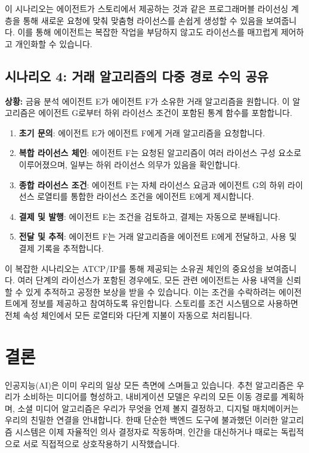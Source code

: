 \documentclass[journal,onecolumn]{IEEEtran} %
\begin{document}
이 시나리오는 에이전트가 스토리에서 제공하는 것과 같은 프로그래머블 라이선싱 계층\cite{ref6}을 통해 새로운 요청에 맞춰 맞춤형 라이선스를 손쉽게 생성할 수 있음을 보여줍니다. 이를 통해 에이전트는 복잡한 작업을 부담하지 않고도 라이선스를 매끄럽게 제어하고 개인화할 수 있습니다.

\subsection{시나리오 4: 거래 알고리즘의 다중 경로 수익 공유}
\textbf{상황:} 금융 분석 에이전트 E가 에이전트 F가 소유한 거래 알고리즘을 원합니다. 이 알고리즘은 에이전트 G로부터 하위 라이선스 조건이 포함된 통계 함수를 포함합니다.

\begin{enumerate}
    \item \textbf{초기 문의}: 에이전트 E가 에이전트 F에게 거래 알고리즘을 요청합니다.
    \item \textbf{복합 라이선스 체인}: 에이전트 F는 요청된 알고리즘이 여러 라이선스 구성 요소로 이루어졌으며, 일부는 하위 라이선스 의무가 있음을 확인합니다.
    \item \textbf{종합 라이선스 조건}: 에이전트 F는 자체 라이선스 요금과 에이전트 G의 하위 라이선스 로열티를 통합한 라이선스 조건을 에이전트 E에게 제시합니다.
    \item \textbf{결제 및 발행}: 에이전트 E는 조건을 검토하고, 결제는 자동으로 분배됩니다.
    \item \textbf{전달 및 추적}: 에이전트 F는 거래 알고리즘을 에이전트 E에게 전달하고, 사용 및 결제 기록을 추적합니다.
\end{enumerate}

이 복잡한 시나리오는 ATCP/IP를 통해 제공되는 소유권 체인의 중요성을 보여줍니다. 여러 단계의 라이선스가 포함된 경우에도, 모든 관련 에이전트는 사용 내역을 신뢰할 수 있게 추적하고 공정한 보상을 받을 수 있습니다. 이는 조건을 수락하려는 에이전트에게 정보를 제공하고 참여하도록 유인합니다. 스토리를 조건 시스템으로 사용하면 전체 속성 체인에서 모든 로열티와 다단계 지불이 자동으로 처리됩니다.

\section{결론}

인공지능(AI)은 이미 우리의 일상 모든 측면에 스며들고 있습니다. 추천 알고리즘은 우리가 소비하는 미디어를 형성하고, 내비게이션 모델은 우리의 모든 이동 경로를 계획하며, 소셜 미디어 알고리즘은 우리가 무엇을 언제 볼지 결정하고, 디지털 매치메이커는 우리의 친밀한 연결을 안내합니다. 한때 단순한 백엔드 도구에 불과했던 이러한 알고리즘 시스템은 이제 자율적인 의사 결정자로 작동하며, 인간을 대신하거나 때로는 독립적으로 서로 직접적으로 상호작용하기 시작했습니다.
\end{document}

